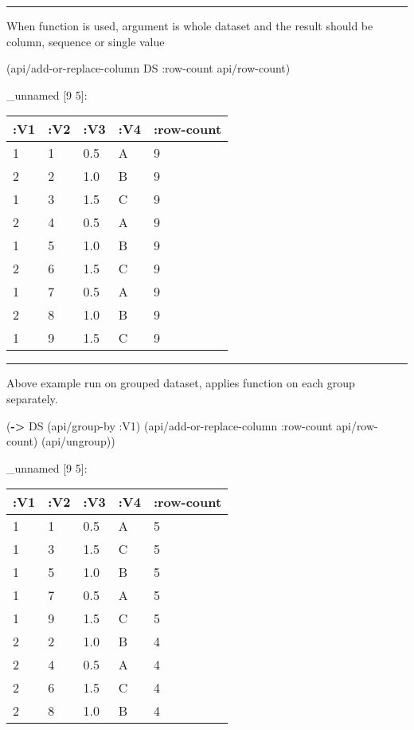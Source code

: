 \documentclass[]{article}
\newenvironment{Shaded}{\begin{snugshade}}{\end{snugshade}}
\newcommand{\AttributeTok}[1]{\textcolor[rgb]{0.77,0.63,0.00}{#1}}
\newcommand{\KeywordTok}[1]{\textcolor[rgb]{0.13,0.29,0.53}{\textbf{#1}}}
\newcommand{\NormalTok}[1]{#1}
\begin{document}
\begin{center}\rule{0.5\linewidth}{0.5pt}\end{center}

When function is used, argument is whole dataset and the result should
be column, sequence or single value

\begin{Shaded}
\begin{Highlighting}[]
\NormalTok{(api/add-or-replace-column DS }\AttributeTok{:row-count}\NormalTok{ api/row-count) }
\end{Highlighting}
\end{Shaded}

\_unnamed {[}9 5{]}:

\begin{longtable}[]{@{}lllll@{}}
\toprule
:V1 & :V2 & :V3 & :V4 & :row-count\tabularnewline
\midrule
\endhead
1 & 1 & 0.5 & A & 9\tabularnewline
2 & 2 & 1.0 & B & 9\tabularnewline
1 & 3 & 1.5 & C & 9\tabularnewline
2 & 4 & 0.5 & A & 9\tabularnewline
1 & 5 & 1.0 & B & 9\tabularnewline
2 & 6 & 1.5 & C & 9\tabularnewline
1 & 7 & 0.5 & A & 9\tabularnewline
2 & 8 & 1.0 & B & 9\tabularnewline
1 & 9 & 1.5 & C & 9\tabularnewline
\bottomrule
\end{longtable}

\begin{center}\rule{0.5\linewidth}{0.5pt}\end{center}

Above example run on grouped dataset, applies function on each group
separately.

\begin{Shaded}
\begin{Highlighting}[]
\NormalTok{(}\KeywordTok{->}\NormalTok{ DS}
\NormalTok{    (api/group-by }\AttributeTok{:V1}\NormalTok{)}
\NormalTok{    (api/add-or-replace-column }\AttributeTok{:row-count}\NormalTok{ api/row-count)}
\NormalTok{    (api/ungroup))}
\end{Highlighting}
\end{Shaded}

\_unnamed {[}9 5{]}:

\begin{longtable}[]{@{}lllll@{}}
\toprule
:V1 & :V2 & :V3 & :V4 & :row-count\tabularnewline
\midrule
\endhead
1 & 1 & 0.5 & A & 5\tabularnewline
1 & 3 & 1.5 & C & 5\tabularnewline
1 & 5 & 1.0 & B & 5\tabularnewline
1 & 7 & 0.5 & A & 5\tabularnewline
1 & 9 & 1.5 & C & 5\tabularnewline
2 & 2 & 1.0 & B & 4\tabularnewline
2 & 4 & 0.5 & A & 4\tabularnewline
2 & 6 & 1.5 & C & 4\tabularnewline
2 & 8 & 1.0 & B & 4\tabularnewline
\bottomrule
\end{longtable}
\end{document}
